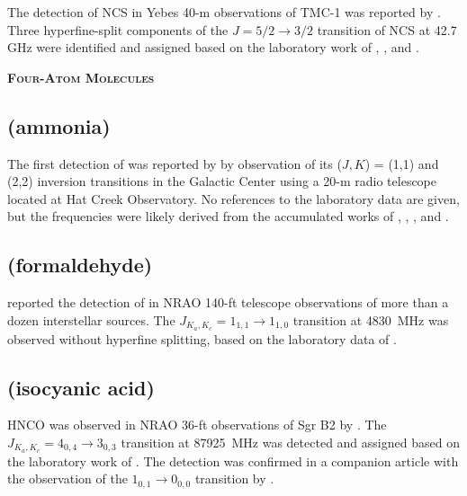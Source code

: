 \documentclass[twocolumn]{aastex631}
\newcommand{\update}[1]{{#1}}
\begin{document}
	\update{The detection of NCS in Yebes 40-m observations of TMC-1 was reported by \citet{Cernicharo:2021ke}.  Three hyperfine-split components of the $J = 5/2\rightarrow3/2$ transition of NCS at 42.7\,GHz were identified and assigned based on the laboratory work of \citet{1991JChPh..95.2275A}, \citet{McCarthy:2003cx}, and \citet{Maeda:2007bi}.}
    
    
    \begin{center}
        \large
        \textsc{\textbf{Four-Atom Molecules}}
        \label{4atoms}
        \normalsize
    \end{center}        
    
    \subsection{ (ammonia)}
	\label{NH3}
	
	The first detection of  was reported by \citet{Cheung:1968yr} by observation of its ($J,K$) = (1,1) and (2,2) inversion transitions in the Galactic Center using a 20-m radio telescope located at Hat Creek Observatory.  No references to the laboratory data are given, but the frequencies were likely derived from the accumulated works of \citet{Cleeton:1934gy}, \citet{GuntherMohr:1954cw}, \citet{Kukolich:1965ey}, and \citet{Kukolich:1967nd}. 
	
	\subsection{ (formaldehyde)}
	\label{H2CO}
	
	\citet{Snyder:1969km} reported the detection of  in NRAO 140-ft telescope observations of more than a dozen interstellar sources.  The $J_{K_a,K_c} = 1_{1,1}\rightarrow1_{1,0}$ transition at 4830~MHz was observed without hyperfine splitting, based on the laboratory data of \citet{Shinegari:1967bl}.
	
	\subsection{ (isocyanic acid)}
	\label{HNCO}

    HNCO was observed in NRAO 36-ft observations of Sgr B2 by \citet{Snyder:1972tq}.  The $J_{K_a,K_c} = 4_{0,4}\rightarrow3_{0,3}$ transition at 87925~MHz was detected and assigned based on the laboratory work of \citet{Kewley:1963cn}.  The detection was confirmed in a companion article with the observation of the $1_{0,1}\rightarrow0_{0,0}$ transition by \citet{Buhl:1972bj}.
    
\end{document}
